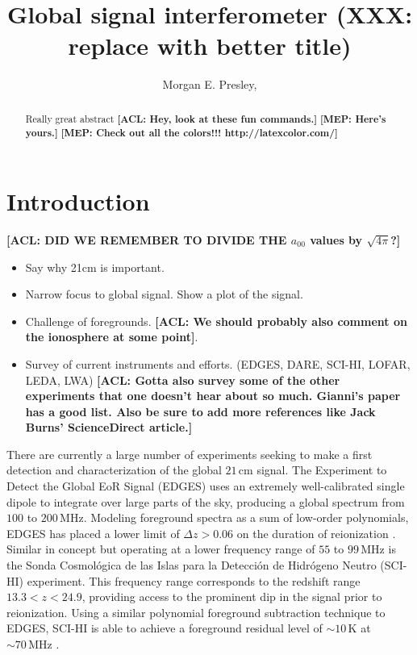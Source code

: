 \documentclass[twolcolumn,apj]{emulateapj}
\newcommand{\acl}[1]{{\color{red} \textbf{[ACL:  #1]}}}
\newcommand{\mep}[1]{{\color{applegreen} \textbf{[MEP:  #1]}}}
\begin{document}
\title{Global signal interferometer (XXX: replace with better title)}

\author{Morgan E. Presley,
}

\begin{abstract}
Really great abstract
\acl{Hey, look at these fun commands.}
\mep{Here's yours.}
\mep {Check out all the colors!!! http://latexcolor.com/}
\end{abstract}



\section{Introduction}
\acl{DID WE REMEMBER TO DIVIDE THE $a_{00}$ values by $\sqrt{4\pi}$?}
\begin{itemize}
\item Say why 21cm is important.
\item Narrow focus to global signal.  Show a plot of the signal.
\item Challenge of foregrounds.  \acl{We should probably also comment on the ionosphere at some point}.
\item Survey of current instruments and efforts. (EDGES, DARE, SCI-HI, LOFAR, LEDA, LWA) \acl{Gotta also survey some of the other experiments that one doesn't hear about so much.  Gianni's paper has a good list.  Also be sure to add more references like Jack Burns' ScienceDirect article.}
\end{itemize}
There are currently a large number of experiments seeking to make a first detection and characterization of the global $21\,\textrm{cm}$ signal.  The Experiment to Detect the Global EoR Signal (EDGES) uses an extremely well-calibrated single dipole \citep{rogersCalib} to integrate over large parts of the sky, producing a global spectrum from $100$ to $200\,\textrm{MHz}$.  Modeling foreground spectra as a sum of low-order polynomials, EDGES has placed a lower limit of $\Delta z > 0.06$ on the duration of reionization \citep{bowmanRogersMeasurement}.  Similar in concept but operating at a lower frequency range of $55$ to $99\,\textrm{MHz}$ is the Sonda Cosmol\'{o}gica de las Islas para la Detecci\'{o}n de Hidr\'{o}geno Neutro (SCI-HI) experiment.  This frequency range corresponds to the redshift range $13.3 < z < 24.9$, providing access to the prominent dip in the signal prior to reionization.  Using a similar polynomial foreground subtraction technique to EDGES, SCI-HI is able to achieve a foreground residual level of $\sim 10\,\textrm{K}$ at $\sim 70 \,\textrm{MHz}$ \citep{voytekSCIHI}.
\end{document}

